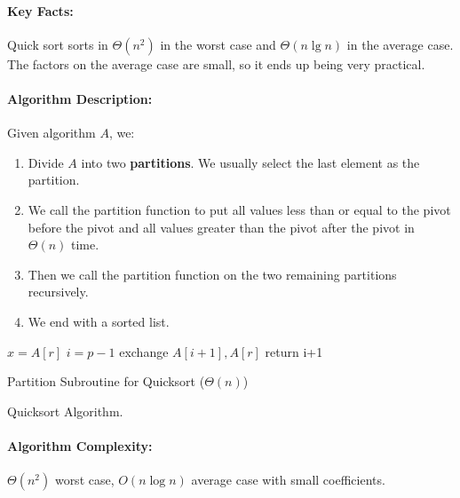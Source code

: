 \documentclass[a4paper,12pt]{report}
\begin{document}
\paragraph{Key Facts: } Quick sort sorts in $\Theta(n^2)$ in the worst case and $\Theta(n\lg n)$ in the average case. The factors on the average case are small, so it ends up being very practical.

\paragraph{Algorithm Description: } Given algorithm $A$, we: 
\begin{enumerate}
\item Divide $A$ into two \textbf{partitions}. We usually select the last element as the partition. 
\item We call the partition function to put all values less than or equal to the pivot before the pivot and all values greater than the pivot after the pivot in $\Theta(n)$ time. 
\item Then we call the partition function on the two remaining partitions recursively.
\item We end with a sorted list.
\end{enumerate}



\begin{algorithm}[H]
\SetAlgoLined
{} 
	\BlankLine
	\BlankLine
	$x = A[r]$
	$i = p-1$
	exchange $A[i+1], A[r]$
	return i+1
	\caption{Partition Subroutine for Quicksort ($\Theta(n)$)}
\end{algorithm}



\begin{algorithm}[H]
\SetAlgoLined
{}
	\BlankLine
	\BlankLine
	\caption{Quicksort Algorithm.}
\end{algorithm}

\paragraph{Algorithm Complexity: } $\Theta(n^2)$ worst case, $O(n\log n)$ average case with small coefficients. 
\end{document}
